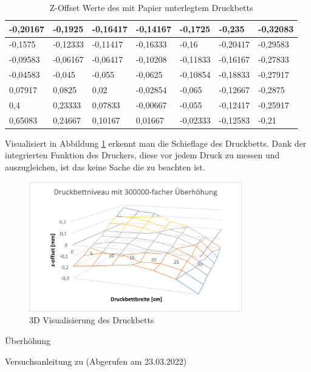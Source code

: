 \documentclass[a4paper,12pt,bibtotocnumbered]{scrartcl}
\numberwithin{equation}{section} %
\begin{document}
\begin{table}[H]
\centering
\caption{Z-Offset Werte des mit Papier unterlegtem Druckbetts}
\label{tab:druckbett2}
\begin{tabular}{|l|l|l|l|l|l|l|}
\hline
-0,20167 & -0,1925  & -0,16417 & -0,14167 & -0,1725  & -0,235   & -0,32083 \\ \hline
-0,1575  & -0,12333 & -0,11417 & -0,16333 & -0,16    & -0,20417 & -0,29583 \\ \hline
-0,09583 & -0,06167 & -0,06417 & -0,10208 & -0,11833 & -0,16167 & -0,27833 \\ \hline
-0,04583 & -0,045   & -0,055   & -0,0625  & -0,10854 & -0,18833 & -0,27917 \\ \hline
0,07917  & 0,0825   & 0,02     & -0,02854 & -0,065   & -0,12667 & -0,2875  \\ \hline
0,4      & 0,23333  & 0,07833  & -0,00667 & -0,055   & -0,12417 & -0,25917 \\ \hline
0,65083  & 0,24667  & 0,10167  & 0,01667  & -0,02333 & -0,12583 & -0,21    \\ \hline
\end{tabular}
\end{table}

Visualisiert in Abbildung \ref*{fig:druckbett3d} erkennt man die Schieflage des Druckbetts. Dank der integrierten Funktion des Druckers, diese vor jedem Druck zu messen und auszugleichen, ist das keine Sache die zu beachten ist.

\begin{figure}[H]
\centerline{\includegraphics[width=350px]{./images/diagramm.png}}
\caption{3D Visualisierung des Druckbetts}
\label{fig:druckbett3d}
\end{figure}


Überhöhung


\newpage
\begin{thebibliography}{999}
 Versuchsanleitung zu (Abgerufen am 23.03.2022) 
\end{thebibliography}
\end{document}
